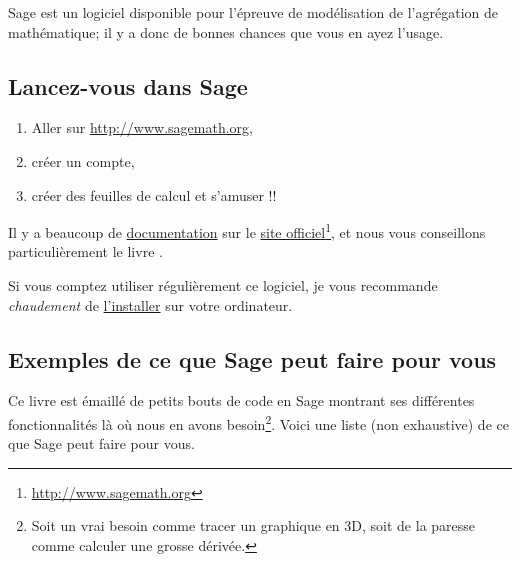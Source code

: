 
Sage est un logiciel disponible pour l'épreuve de modélisation de l'agrégation de mathématique; il y a donc de bonnes chances que vous en ayez l'usage.

\subsection{Lancez-vous dans Sage}


\begin{enumerate}
	\item
        Aller sur \url{http://www.sagemath.org},
	\item
		créer un compte,
	\item
		créer des feuilles de calcul et s'amuser !!
\end{enumerate}

Il y a beaucoup de \href{http://lmgtfy.com/?q=sage+documentation}{documentation} sur le \href{http://www.sagemath.org}{site officiel}\footnote{\href{http://www.sagemath.org}{http://www.sagemath.org}}, et nous vous conseillons particulièrement le livre \cite{ooBLMMooWTPsQy}.

Si vous comptez utiliser régulièrement ce logiciel, je vous recommande \emph{chaudement} de \href{http://mirror.switch.ch/mirror/sagemath/index.html}{l'installer} sur votre ordinateur.

\subsection{Exemples de ce que Sage peut faire pour vous}

Ce livre est émaillé de petits bouts de code en Sage montrant ses différentes fonctionnalités là où nous en avons besoin\footnote{Soit un vrai besoin comme tracer un graphique en 3D, soit de la paresse comme calculer une grosse dérivée.}. Voici une liste (non exhaustive) de ce que Sage peut faire pour vous.


